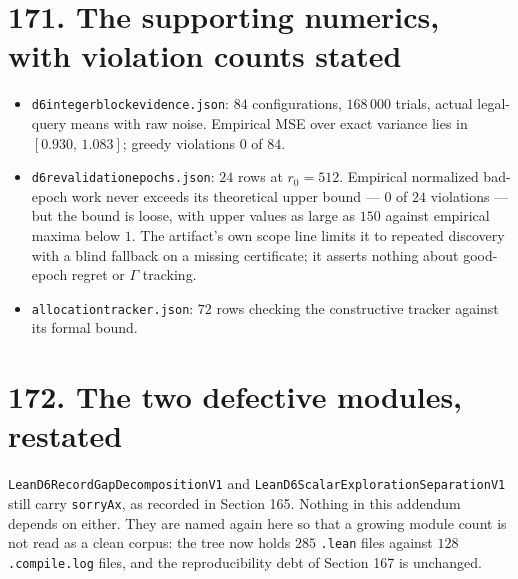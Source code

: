 \documentclass[9pt,twocolumn]{article}
\renewcommand{\_}{\CIGunderscore\allowbreak}
\begin{document}
\section*{171. The supporting numerics, with violation counts stated}
\begin{itemize}
\item \texttt{d6\_integer\_block\_evidence.json}: $84$ configurations, $168\,000$ trials, actual legal-query means with raw noise. Empirical MSE over exact variance lies in $[0.930,\,1.083]$; greedy violations $0$ of $84$.
\item \texttt{d6\_revalidation\_epochs.json}: $24$ rows at $r_0 = 512$. Empirical normalized bad-epoch work never exceeds its theoretical upper bound --- $0$ of $24$ violations --- but the bound is loose, with upper values as large as $150$ against empirical maxima below $1$. The artifact's own scope line limits it to repeated discovery with a blind fallback on a missing certificate; it asserts nothing about good-epoch regret or $\Gamma$ tracking.
\item \texttt{allocation\_tracker.json}: $72$ rows checking the constructive tracker against its formal bound.
\end{itemize}

\section*{172. The two defective modules, restated}
\texttt{LeanD6RecordGapDecompositionV1} and \texttt{LeanD6ScalarExplorationSeparationV1} still carry \texttt{sorryAx}, as recorded in Section 165. Nothing in this addendum depends on either. They are named again here so that a growing module count is not read as a clean corpus: the tree now holds $285$ \texttt{.lean} files against $128$ \texttt{.compile.log} files, and the reproducibility debt of Section 167 is unchanged.
\end{document}
